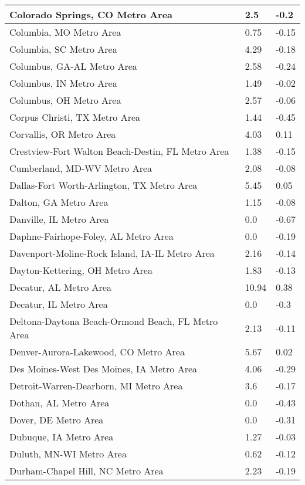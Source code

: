 \documentclass[12pt,oneside, letterpaper]{book}
\begin{document}
\begin{longtable}{| p{} | p{} | p{} |}
    Colorado Springs, CO Metro Area & 2.5 & -0.2 \\ \hline
    Columbia, MO Metro Area & 0.75 & -0.15 \\ \hline
    Columbia, SC Metro Area & 4.29 & -0.18 \\ \hline
    Columbus, GA-AL Metro Area & 2.58 & -0.24 \\ \hline
    Columbus, IN Metro Area & 1.49 & -0.02 \\ \hline
    Columbus, OH Metro Area & 2.57 & -0.06 \\ \hline
    Corpus Christi, TX Metro Area & 1.44 & -0.45 \\ \hline
    Corvallis, OR Metro Area & 4.03 & 0.11 \\ \hline
    Crestview-Fort Walton Beach-Destin, FL Metro Area & 1.38 & -0.15 \\ \hline
    Cumberland, MD-WV Metro Area & 2.08 & -0.08 \\ \hline
    Dallas-Fort Worth-Arlington, TX Metro Area & 5.45 & 0.05 \\ \hline
    Dalton, GA Metro Area & 1.15 & -0.08 \\ \hline
    Danville, IL Metro Area & 0.0 & -0.67 \\ \hline
    Daphne-Fairhope-Foley, AL Metro Area & 0.0 & -0.19 \\ \hline
    Davenport-Moline-Rock Island, IA-IL Metro Area & 2.16 & -0.14 \\ \hline
    Dayton-Kettering, OH Metro Area & 1.83 & -0.13 \\ \hline
    Decatur, AL Metro Area & 10.94 & 0.38 \\ \hline
    Decatur, IL Metro Area & 0.0 & -0.3 \\ \hline
    Deltona-Daytona Beach-Ormond Beach, FL Metro Area & 2.13 & -0.11 \\ \hline
    Denver-Aurora-Lakewood, CO Metro Area & 5.67 & 0.02 \\ \hline
    Des Moines-West Des Moines, IA Metro Area & 4.06 & -0.29 \\ \hline
    Detroit-Warren-Dearborn, MI Metro Area & 3.6 & -0.17 \\ \hline
    Dothan, AL Metro Area & 0.0 & -0.43 \\ \hline
    Dover, DE Metro Area & 0.0 & -0.31 \\ \hline
    Dubuque, IA Metro Area & 1.27 & -0.03 \\ \hline
    Duluth, MN-WI Metro Area & 0.62 & -0.12 \\ \hline
    Durham-Chapel Hill, NC Metro Area & 2.23 & -0.19 \\ \hline

\end{longtable}
\end{document}
